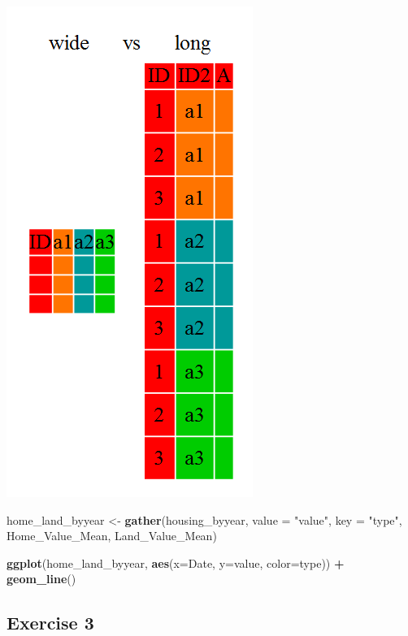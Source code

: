 \documentclass[]{book}
\newenvironment{Shaded}{\begin{snugshade}}{\end{snugshade}}
\newcommand{\DataTypeTok}[1]{\textcolor[rgb]{0.13,0.29,0.53}{#1}}
\newcommand{\KeywordTok}[1]{\textcolor[rgb]{0.13,0.29,0.53}{\textbf{#1}}}
\newcommand{\NormalTok}[1]{#1}
\newcommand{\OperatorTok}[1]{\textcolor[rgb]{0.81,0.36,0.00}{\textbf{#1}}}
\newcommand{\StringTok}[1]{\textcolor[rgb]{0.31,0.60,0.02}{#1}}
\begin{document}
\includegraphics{R/Rgraphics/images/wide_vs_long.png}

\begin{Shaded}
\begin{Highlighting}[]
\NormalTok{home_land_byyear <-}\StringTok{ }\KeywordTok{gather}\NormalTok{(housing_byyear,}
                           \DataTypeTok{value =} \StringTok{"value"}\NormalTok{,}
                           \DataTypeTok{key =} \StringTok{"type"}\NormalTok{,}
\NormalTok{                           Home_Value_Mean, Land_Value_Mean)}

\KeywordTok{ggplot}\NormalTok{(home_land_byyear, }\KeywordTok{aes}\NormalTok{(}\DataTypeTok{x=}\NormalTok{Date, }\DataTypeTok{y=}\NormalTok{value, }\DataTypeTok{color=}\NormalTok{type)) }\OperatorTok{+}
\StringTok{  }\KeywordTok{geom_line}\NormalTok{()}
\end{Highlighting}
\end{Shaded}

\hypertarget{exercise-3-2}{%
\subsection{Exercise 3}\label{exercise-3-2}}
\end{document}
